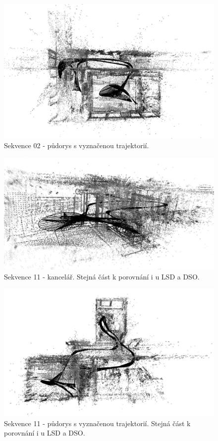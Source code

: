 \documentclass[12pt,a4paper]{article}
\begin{document}
\begin{figure}[H]
\centering
\includegraphics[width=1\textwidth]{img/LDSO_02_top_b.png}
\caption{Sekvence 02 - půdorys s vyznačenou trajektorií.}
\end{figure}

\begin{figure}[H]
\centering
\includegraphics[width=1\textwidth]{img/LDSO_kancl_b.png}
\caption{Sekvence 11 - kancelář. Stejná část k porovnání i u LSD a DSO.}
\end{figure}

\begin{figure}[H]
\centering
\includegraphics[width=1\textwidth]{img/LDSO_11_top_b.png}
\caption{Sekvence 11 - půdorys s vyznačenou trajektorií. Stejná část k porovnání i u LSD a DSO.}
\end{figure}
\end{document}
